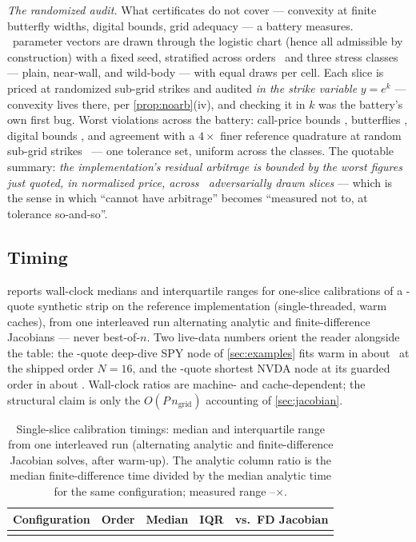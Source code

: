 \emph{The randomized audit.}  What certificates do not cover ---
convexity at finite butterfly widths, digital bounds, grid adequacy ---
a battery measures.  \MacAuditSliceCount\ parameter vectors are drawn
through the logistic chart (hence all admissible by construction) with
a fixed seed, stratified across orders \MacCertOrdersList\ and three
stress classes --- plain, near-wall, and wild-body --- with equal
draws per cell.  Each slice is priced at randomized sub-grid strikes
and audited \emph{in the strike variable} $y=e^{k}$ --- convexity lives
there, per \cref{prop:noarb}(iv), and checking it in $k$ was the
battery's own first bug.  Worst violations across the battery:
call-price bounds \MacAuditBoundsWorst, butterflies \MacAuditFlyWorst,
digital bounds \MacAuditDigitalWorst, and agreement with a $4\times$
finer reference quadrature at random sub-grid strikes
\MacAuditGridAgreeWorst\ --- one tolerance set, uniform across the
classes.  The quotable summary: \emph{the implementation's residual
arbitrage is bounded by the worst figures just quoted, in normalized
price, across \MacAuditSliceCount\ adversarially drawn slices} --- which
is the sense
in which ``cannot have arbitrage'' becomes ``measured not to, at
tolerance so-and-so''.

\subsection{Timing}

 reports wall-clock medians and interquartile ranges
for one-slice calibrations of a \MacTimingQuoteCount-quote synthetic
strip on the reference implementation (single-threaded, warm caches),
from one interleaved run alternating analytic and finite-difference
Jacobians --- never best-of-$n$.  Two live-data numbers orient the
reader alongside the table: the \MacSpyDecNQuotes-quote deep-dive SPY
node of \cref{sec:examples} fits warm in about \MacFitMsOrderSixteen\
at the shipped order $N=16$, and the
\MacGuardQuoteCountZeroDte-quote shortest NVDA node at its guarded
order in about \MacFitMsZeroDte.  Wall-clock ratios are
machine- and cache-dependent; the structural claim is only the
$O(P\,n_{\mathrm{grid}})$ accounting of \cref{sec:jacobian}.

\begin{table}[htbp]
\centering\small
\begin{tabular}{@{}lrrrr@{}}
\toprule
Configuration & Order & Median & IQR & vs.\ FD Jacobian\\
\midrule
\MacTimingRows\\
\bottomrule
\end{tabular}
\caption{Single-slice calibration timings: median and interquartile
range from one interleaved run (alternating analytic and
finite-difference Jacobian solves, after warm-up).  The analytic column
ratio is the median finite-difference time divided by the median
analytic time for the same configuration; measured range
\MacJacSpeedupMin--\MacJacSpeedupMax$\times$.}
\label{tab:timing}
\end{table}

